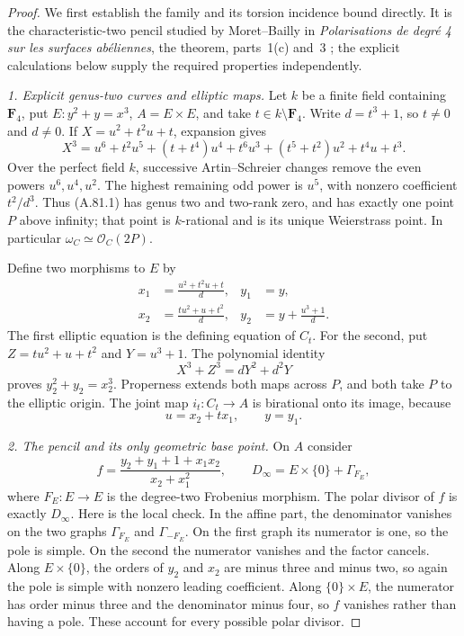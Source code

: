 \documentclass[11pt]{article}
\begin{document}
\begin{proof}
We first establish the family and its torsion incidence
bound directly. It is the characteristic-two pencil
studied by Moret--Bailly in \emph{Polarisations de degr\'e 4
sur les surfaces ab\'eliennes}, the theorem, parts~1(c) and~3
\citep{AG_MoretBailly1979}; the explicit calculations below
supply the required properties independently.

\emph{1. Explicit genus-two curves and elliptic maps.}
Let $k$ be a finite field containing $\mathbf F_4$, put
$E:y^2+y=x^3$, $A=E\times E$, and take
$t\in k\setminus\mathbf F_4$. Write $d=t^3+1$, so
$t\ne0$ and $d\ne0$. If $X=u^2+t^2u+t$, expansion gives
\[
 X^3=u^6+t^2u^5+(t+t^4)u^4+t^6u^3
                +(t^5+t^2)u^2+t^4u+t^3.
\]
Over the perfect field $k$, successive Artin--Schreier
changes remove the even powers $u^6,u^4,u^2$. The highest
remaining odd power is $u^5$, with nonzero coefficient
$t^2/d^3$. Thus (A.81.1) has genus two and two-rank zero,
and has exactly one point $P$ above infinity; that point
is $k$-rational and is its unique Weierstrass point.
In particular $\omega_C\simeq\mathcal O_C(2P)$.

Define two morphisms to $E$ by
\[
\begin{aligned}
 x_1&=\frac{u^2+t^2u+t}{d}, & y_1&=y,\\
 x_2&=\frac{tu^2+u+t^2}{d}, & y_2&=y+\frac{u^3+1}{d}.
\end{aligned}                                                   \tag{A.81.2}
\]
The first elliptic equation is the defining equation of
$C_t$. For the second, put $Z=tu^2+u+t^2$ and $Y=u^3+1$.
The polynomial identity
\[
                 X^3+Z^3=dY^2+d^2Y
\]
proves $y_2^2+y_2=x_2^3$. Properness extends both maps
across $P$, and both take $P$ to the elliptic origin.
The joint map $i_t:C_t\to A$ is birational onto its image,
because
\[
                         u=x_2+t x_1,
                         \qquad y=y_1.                \tag{A.81.3}
\]

\emph{2. The pencil and its only geometric base point.}
On $A$ consider
\[
 f=\frac{y_2+y_1+1+x_1x_2}{x_2+x_1^2},\qquad
 D_\infty=E\times\{0\}+\Gamma_{F_E},                 \tag{A.81.4}
\]
where $F_E:E\to E$ is the degree-two Frobenius morphism.
The polar divisor of $f$ is exactly $D_\infty$.
Here is the local check. In the affine part, the denominator
vanishes on the two graphs $\Gamma_{F_E}$ and
$\Gamma_{-F_E}$. On the first graph its numerator is one,
so the pole is simple. On the second the numerator
vanishes and the factor cancels. Along $E\times\{0\}$,
the orders of $y_2$ and $x_2$ are minus three and minus two,
so again the pole is simple with nonzero leading coefficient.
Along $\{0\}\times E$, the numerator has order minus three
and the denominator minus four, so $f$ vanishes rather
than having a pole. These account for every possible
polar divisor.


\end{proof}
\end{document}
